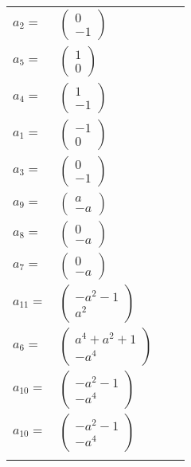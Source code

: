 \documentclass[1p]{elsarticle_modified}
\theoremstyle{definition}
\begin{document}
\begin{tabular}{m{7pt} m{180pt} m{7pt} m{180pt} }
\flushright $a_{2}=$&$\begin{pmatrix}0\\-1\end{pmatrix}$ \\
\flushright $a_{5}=$&$\begin{pmatrix}1\\0\end{pmatrix}$ \\
\flushright $a_{4}=$&$\begin{pmatrix}1\\-1\end{pmatrix}$ \\
\flushright $a_{1}=$&$\begin{pmatrix}-1\\0\end{pmatrix}$ \\
\flushright $a_{3}=$&$\begin{pmatrix}0\\-1\end{pmatrix}$ \\
\flushright $a_{9}=$&$\begin{pmatrix}a\\- a\end{pmatrix}$ \\
\flushright $a_{8}=$&$\begin{pmatrix}0\\- a\end{pmatrix}$ \\
\flushright $a_{7}=$&$\begin{pmatrix}0\\- a\end{pmatrix}$ \\
\flushright $a_{11}=$&$\begin{pmatrix}- a^2-1\\a^2\end{pmatrix}$ \\
\flushright $a_{6}=$&$\begin{pmatrix}a^4+a^2+1\\- a^4\end{pmatrix}$ \\
\flushright $a_{10}=$&$\begin{pmatrix}- a^2-1\\- a^4\end{pmatrix}$\\ \flushright $a_{10}=$&$\begin{pmatrix}- a^2-1\\- a^4\end{pmatrix}$\\&\end{tabular}
\end{document}
